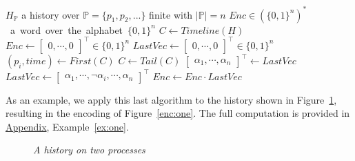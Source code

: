 \documentclass[12pt]{article}
\begin{document}
\begin{algorithm}[H]
\caption{Basic Timeline}\label{alg:basicTimeline}
\begin{algorithmic}[1]
\Require $H_\mathbb{P}$ a history over \mbox{$\mathbb{P}=\{p_1,p_2,...\}$} finite with $|\mathbb{P}|=n$
\Ensure \mbox{$Enc\in(\{0,1\}^n)^*$ a word over the alphabet $\{0,1\}^n$}
\State $C \gets Timeline(H)$
\State $Enc \gets \begin{bmatrix} 0 , \cdots ,0 \end{bmatrix}^\top\in \{0,1\}^n $
\State $LastVec\gets \begin{bmatrix} 0 , \cdots , 0 \end{bmatrix}^\top\in \{0,1\}^n$
	\State $(p_i,time)\gets First(C)$
	\State $C\gets Tail(C)$
	\State $\begin{bmatrix}\alpha_1 , \cdots , \alpha_n\end{bmatrix}^\top \gets LastVec$
	\State $LastVec\gets\begin{bmatrix}\alpha_1 , \cdots , \neg\alpha_i , \cdots , \alpha_n\end{bmatrix}^\top$ 
	\State $Enc\gets Enc\cdot LastVec$
\EndWhile

\end{algorithmic}
\end{algorithm}

\vspace{1em}

As an example, we apply this last algorithm to the history shown in Figure~\ref{fig:exampleEncoding}, resulting in the encoding of Figure~\ref{enc:one}. The full computation is provided in \hyperref[sec:appendix]{Appendix}, Example~\ref{ex:one}.

\begin{figure}
\begin{center}
\end{center}
\caption{\small \slshape A history on two processes}\label{fig:exampleEncoding}
\end{figure}
\end{document}
